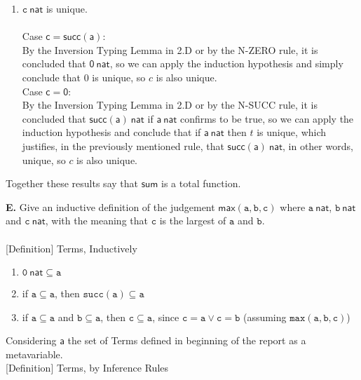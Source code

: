 \documentclass[a4paper]{article}
\begin{document}
\begin{enumerate}
\item $\mathtt c~\mathsf{nat}$ is unique.\\\\
Case $\mathsf {c = succ(a)}$:\\
  By the Inversion Typing Lemma in 2.D or by the N-ZERO rule, it is concluded that $\mathsf {0}~\mathsf{nat}$, so we can apply the induction hypothesis and simply conclude that 0 is unique, so $c$ is also unique.\\
  
  Case $\mathsf {c = 0}$:\\
  By the Inversion Typing Lemma in 2.D or by the N-SUCC rule, it is concluded that $\mathsf {succ(a)}~\mathsf{nat}$ if $\mathsf {a}~\mathsf{nat}$ confirms to be true, so we can apply the induction hypothesis and conclude that if $\mathsf {a}~\mathsf{nat}$ then $t$ is unique, which justifies, in the previously mentioned rule, that $\mathsf {succ(a)}~\mathsf{nat}$, in other words, unique, so $c$ is also unique.\\
\end{enumerate}

Together these results say that $\mathsf{sum}$ is a total function.

\textbf{E.} Give an inductive definition of the judgement
$\mathsf{max}(\mathtt a, \mathtt b, \mathtt c)$ where $\mathtt a~\mathsf{nat}$,
$\mathtt b~\mathsf{nat}$ and $\mathtt c~\mathsf{nat}$, with the meaning that
$\mathtt c$ is the largest of $\mathtt a$ and $\mathtt b$.\\\\
{[Definition]} Terms, Inductively
\begin{enumerate}
\item $\mathtt 0~\mathsf{nat} \subseteq \mathtt a$
\item if $\mathtt a \subseteq \mathtt a$, then $\mathtt {succ(a)} \subseteq \mathtt a$
\item if $\mathtt a \subseteq \mathtt a$ and $\mathtt b \subseteq \mathtt a$, then  $\mathtt c \subseteq \mathtt a$, since $\mathtt {c = a \lor c = b} $ (assuming $\mathtt {max(a, b, c)}$)
\end{enumerate}
Considering $\mathsf a$ the set of Terms defined in beginning of the report as a metavariable.\\
{[Definition]} Terms, by Inference Rules
\end{document}
